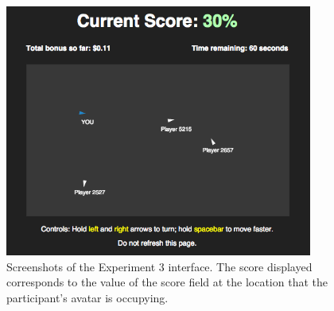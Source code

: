 \documentclass[12pt,letterpaper]{article}
\begin{document}
\begin{figure}
  \centering
  \includegraphics[width=0.9\textwidth]{./figures/interface}
  \caption{Screenshots of the Experiment 3 interface.  The
    score displayed corresponds to the value of the score field at the
    location that the participant's avatar is occupying.}
  \label{fig:exp3_interface}
\end{figure}



\setlength{\bibleftmargin}{.125in}
\setlength{\bibindent}{-\bibleftmargin}

\small{
  
}
\end{document}
